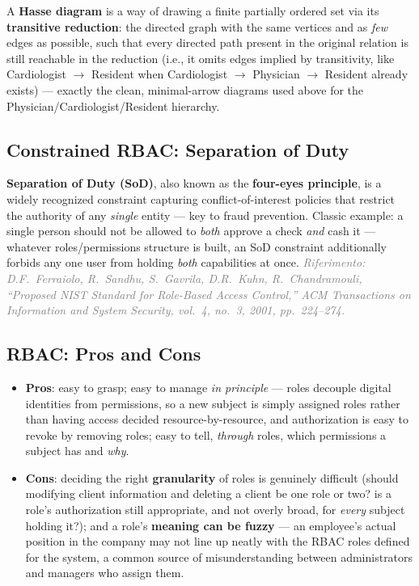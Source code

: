 \documentclass[12pt, a4paper]{article}
\begin{document}
A \textbf{Hasse diagram} is a way of drawing a finite partially ordered set via its \textbf{transitive reduction}: the directed graph with the same vertices and as \emph{few} edges as possible, such that every directed path present in the original relation is still reachable in the reduction (i.e., it omits edges implied by transitivity, like Cardiologist $\to$ Resident when Cardiologist $\to$ Physician $\to$ Resident already exists) --- exactly the clean, minimal-arrow diagrams used above for the Physician/Cardiologist/Resident hierarchy.

\subsection{Constrained RBAC: Separation of Duty}
\textbf{Separation of Duty (SoD)}, also known as the \textbf{four-eyes principle}, is a widely recognized constraint capturing conflict-of-interest policies that restrict the authority of any \emph{single} entity --- key to fraud prevention. Classic example: a single person should not be allowed to \emph{both} approve a check \emph{and} cash it --- whatever roles/permissions structure is built, an SoD constraint additionally forbids any one user from holding \emph{both} capabilities at once. \textcolor{gray}{\textit{Riferimento: D.F.\ Ferraiolo, R.\ Sandhu, S.\ Gavrila, D.R.\ Kuhn, R.\ Chandramouli, ``Proposed NIST Standard for Role-Based Access Control,'' ACM Transactions on Information and System Security, vol.\ 4, no.\ 3, 2001, pp.\ 224--274.}}

\subsection{RBAC: Pros and Cons}
\begin{itemize}
    \item \textbf{Pros}: easy to grasp; easy to manage \emph{in principle} --- roles decouple digital identities from permissions, so a new subject is simply assigned roles rather than having access decided resource-by-resource, and authorization is easy to revoke by removing roles; easy to tell, \emph{through} roles, which permissions a subject has and \emph{why}.
    \item \textbf{Cons}: deciding the right \textbf{granularity} of roles is genuinely difficult (should modifying client information and deleting a client be one role or two? is a role's authorization still appropriate, and not overly broad, for \emph{every} subject holding it?); and a role's \textbf{meaning can be fuzzy} --- an employee's actual position in the company may not line up neatly with the RBAC roles defined for the system, a common source of misunderstanding between administrators and managers who assign them.
\end{itemize}
\end{document}
